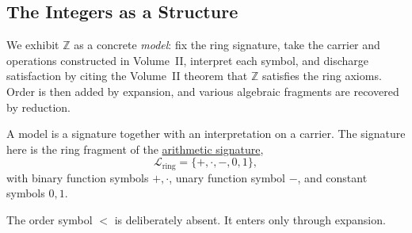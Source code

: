 %

\subsection*{The Integers as a Structure}

\begin{remark*}
We exhibit $\mathbb{Z}$ as a concrete \emph{model}: fix the ring signature,
take the carrier and operations constructed in Volume~II, interpret each
symbol, and discharge satisfaction by citing the Volume~II theorem that
$\mathbb{Z}$ satisfies the ring axioms. Order is then added by expansion, and
various algebraic fragments are recovered by reduction.
\end{remark*}


\begin{remark*}[Exposition]
A model is a signature together with an interpretation on a carrier. The
signature here is the ring fragment of the
\hyperref[def:arithmetic-signature]{arithmetic signature},
\[
\mathcal{L}_{\mathrm{ring}}
=
\{+,\cdot,-,0,1\},
\]
with binary function symbols $+,\cdot$, unary function symbol $-$, and
constant symbols $0,1$.

The order symbol $<$ is deliberately absent. It enters only through expansion.
\end{remark*}


